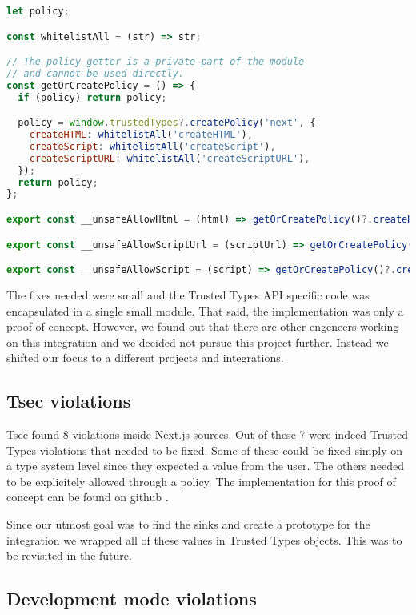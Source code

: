 \bigskip
\begin{lstlisting}[language=JavaScript, caption=Example of Next.js Trusted Types API]
let policy;

const whitelistAll = (str) => str;

// The policy getter is a private part of the module
// and cannot be used directly.
const getOrCreatePolicy = () => {
  if (policy) return policy;

  policy = window.trustedTypes?.createPolicy('next', {
    createHTML: whitelistAll('createHTML'),
    createScript: whitelistAll('createScript'),
    createScriptURL: whitelistAll('createScriptURL'),
  });
  return policy;
};

export const __unsafeAllowHtml = (html) => getOrCreatePolicy()?.createHTML(html) ?? html;

export const __unsafeAllowScriptUrl = (scriptUrl) => getOrCreatePolicy()?.createScriptURL(scriptUrl) ?? scriptUrl;

export const __unsafeAllowScript = (script) => getOrCreatePolicy()?.createScript(script) ?? script;
\end{lstlisting}

The fixes needed were small and the Trusted Types API specific code was encapsulated in a single
small module. That said, the implementation was only a proof of concept. However, we found out that
there are other engeneers working on this integration and we decided not pursue this project
further. Instead we shifted our focus to a different projects and integrations.

\subsection{Tsec violations}

Tsec found 8 violations \cite{tsec_output} inside Next.js sources. Out of these 7 were indeed
Trusted Types violations that needed to be fixed. Some of these could be fixed simply on a type
system level since they expected a value from the user. The others needed to be explicitely allowed
through a policy. The implementation for this proof of concept can be found on github
\cite{nextjs_fix_tsec_violations_commit}.

Since our utmost goal was to find the sinks and create a prototype for the integration we wrapped
all of these values in Trusted Types objects. This was to be revisited in the future.

\subsection{Development mode violations}

